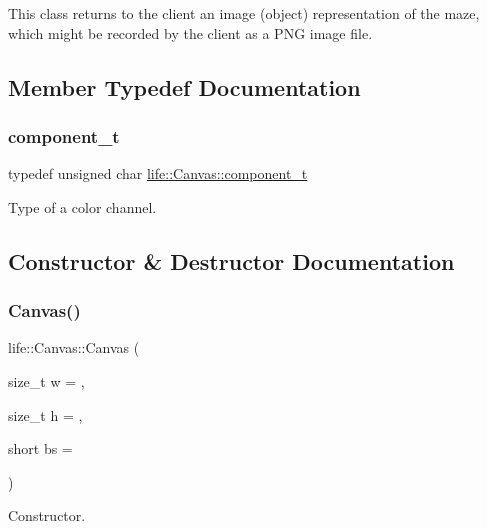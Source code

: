 This class returns to the client an image (object) representation of the maze, which might be recorded by the client as a P\+NG image file. 

\subsection{Member Typedef Documentation}
\mbox{\label{classlife_1_1_canvas_aa0de8894cefde751c08728d25e75a911}} 
\subsubsection{\texorpdfstring{component\_t}{component\_t}}
{\footnotesize\ttfamily typedef unsigned char \mbox{\hyperlink{classlife_1_1_canvas_aa0de8894cefde751c08728d25e75a911}{life\+::\+Canvas\+::component\+\_\+t}}}



Type of a color channel. 



\subsection{Constructor \& Destructor Documentation}
\mbox{\label{classlife_1_1_canvas_ac719467462d0e2267cab32c5726b890a}} 
\subsubsection{\texorpdfstring{Canvas()}{Canvas()}\hspace{0.1cm}{\footnotesize\ttfamily [1/3]}}
{\footnotesize\ttfamily life\+::\+Canvas\+::\+Canvas (\begin{DoxyParamCaption}\item[{size\+\_\+t}]{w = {},  }\item[{size\+\_\+t}]{h = {},  }\item[{short}]{bs = {} }\end{DoxyParamCaption})\hspace{0.3cm}{\ttfamily [inline]}}



Constructor. 

